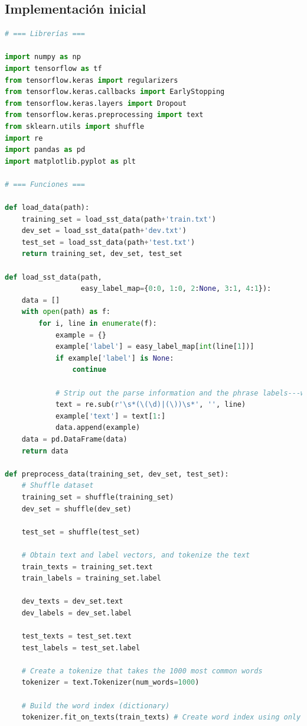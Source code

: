 \documentclass{report}
\begin{document}
      \subsection*{Implementación inicial}
        \begin{lstlisting}[language=Python, caption=Implementación inicial del perceptron]
# === Librerías ===

import numpy as np
import tensorflow as tf
from tensorflow.keras import regularizers
from tensorflow.keras.callbacks import EarlyStopping
from tensorflow.keras.layers import Dropout
from tensorflow.keras.preprocessing import text
from sklearn.utils import shuffle
import re
import pandas as pd
import matplotlib.pyplot as plt

# === Funciones ===

def load_data(path):
    training_set = load_sst_data(path+'train.txt')
    dev_set = load_sst_data(path+'dev.txt')
    test_set = load_sst_data(path+'test.txt')
    return training_set, dev_set, test_set

def load_sst_data(path,
                  easy_label_map={0:0, 1:0, 2:None, 3:1, 4:1}):
    data = []
    with open(path) as f:
        for i, line in enumerate(f):
            example = {}
            example['label'] = easy_label_map[int(line[1])]
            if example['label'] is None:
                continue

            # Strip out the parse information and the phrase labels---we don't need those here
            text = re.sub(r'\s*(\(\d)|(\))\s*', '', line)
            example['text'] = text[1:]
            data.append(example)
    data = pd.DataFrame(data)
    return data

def preprocess_data(training_set, dev_set, test_set):
    # Shuffle dataset
    training_set = shuffle(training_set)
    dev_set = shuffle(dev_set)

    test_set = shuffle(test_set)

    # Obtain text and label vectors, and tokenize the text
    train_texts = training_set.text
    train_labels = training_set.label

    dev_texts = dev_set.text
    dev_labels = dev_set.label

    test_texts = test_set.text
    test_labels = test_set.label

    # Create a tokenize that takes the 1000 most common words
    tokenizer = text.Tokenizer(num_words=1000)

    # Build the word index (dictionary)
    tokenizer.fit_on_texts(train_texts) # Create word index using only training part


\end{lstlisting}
\end{document}
